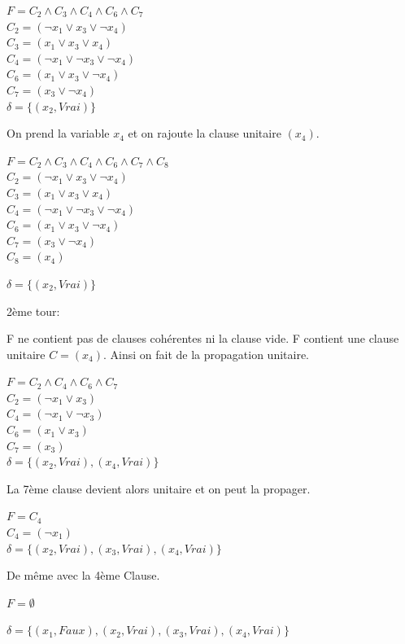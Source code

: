 \documentclass[12pt]{extarticle}
\begin{document}
$F = C_2 \land C_3 \land C_4 \land C_6 \land C_7$ \\
$C_2 = (\lnot{x_1} \lor x_3 \lor \lnot{x_4})$ \\
$C_3 = (x_1 \lor x_3 \lor x_4)$ \\
$C_4 = (\lnot{x_1} \lor \lnot{x_3} \lor \lnot{x_4})$ \\
$C_6 = (x_1 \lor x_3 \lor \lnot{x_4})$ \\
$C_7 = (x_3 \lor \lnot{x_4})$ \\

$\delta = \{(x_2, Vrai)\}$

On prend la variable $x_4$ et on rajoute la clause unitaire $(x_4)$.

$F = C_2 \land C_3 \land C_4 \land C_6 \land C_7 \land C_8$ \\
$C_2 = (\lnot{x_1} \lor x_3 \lor \lnot{x_4})$ \\
$C_3 = (x_1 \lor x_3 \lor x_4)$ \\
$C_4 = (\lnot{x_1} \lor \lnot{x_3} \lor \lnot{x_4})$ \\
$C_6 = (x_1 \lor x_3 \lor \lnot{x_4})$ \\
$C_7 = (x_3 \lor \lnot{x_4})$ \\
$C_8 = (x_4)$

$\delta = \{(x_2, Vrai)\}$

2ème tour:

F ne contient pas de clauses cohérentes ni la clause vide. F contient une clause unitaire $C = (x_4)$. Ainsi on fait de la propagation unitaire.

$F = C_2 \land C_4 \land C_6 \land C_7$ \\
$C_2 = (\lnot{x_1} \lor x_3)$ \\
$C_4 = (\lnot{x_1} \lor \lnot{x_3})$ \\
$C_6 = (x_1 \lor x_3)$ \\
$C_7 = (x_3)$ \\

$\delta = \{(x_2, Vrai), (x_4, Vrai)\}$

La 7ème clause devient alors unitaire et on peut la propager.

$F = C_4$ \\
$C_4 = (\lnot{x_1})$ \\

$\delta = \{(x_2, Vrai), (x_3, Vrai), (x_4, Vrai)\}$

De même avec la 4ème Clause.

$F = \emptyset$

$\delta = \{(x_1, Faux), (x_2, Vrai), (x_3, Vrai), (x_4, Vrai)\}$
\end{document}
